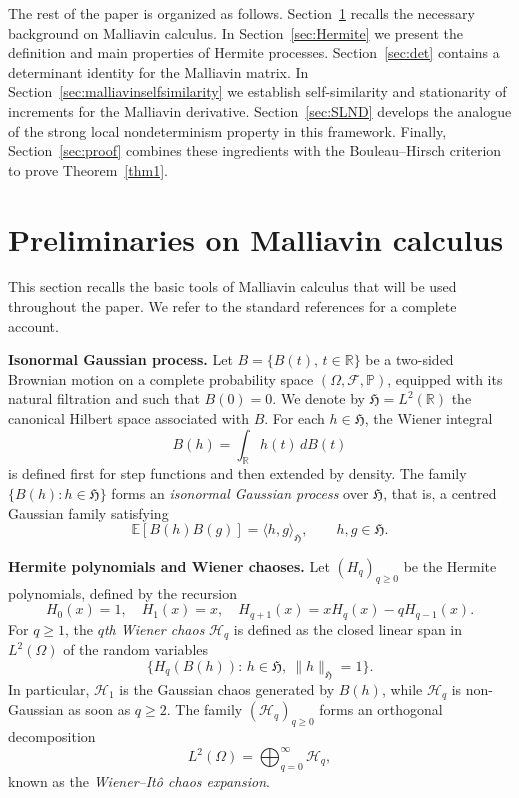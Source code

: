 \documentclass[a4paper,10pt]{article}
\theoremstyle{definition}
\theoremstyle{plain}
\newcommand{\R}{\mathbb{R}}
\renewcommand{\P}{\mathbb{P}}
\newcommand{\E}{\mathbb{E}}
\newcommand\HHH{\mathfrak{H}}
\newcommand\1{\mathbbm{1}}
\begin{document}
\medskip
The rest of the paper is organized as follows.
Section~\ref{sec:Malliavin} recalls the necessary background on Malliavin calculus.  
In Section~\ref{sec:Hermite} we present the definition and main properties of Hermite processes.  
Section~\ref{sec:det} contains a determinant identity for the Malliavin matrix. 
In Section~\ref{sec:malliavinselfsimilarity} we establish self-similarity and stationarity of increments for  the Malliavin derivative.  
Section~\ref{sec:SLND} develops the analogue of the strong local nondeterminism property in this framework.  
Finally, Section~\ref{sec:proof} combines these ingredients with the Bouleau--Hirsch criterion to prove Theorem~\ref{thm1}.



\section{Preliminaries on Malliavin calculus}\label{sec:Malliavin}

This section recalls the basic tools of Malliavin calculus that will be used throughout the paper.  
We refer to the standard references \cite{nourdin2012normal, Nualart, Sanz-Sole} for a complete account.


\medskip
\noindent\textbf{Isonormal Gaussian process.}  
Let $B=\{B(t),\,t\in\R\}$ be a two-sided  Brownian motion on a complete probability space $(\Omega,\mathcal F,\P)$, equipped with its natural filtration and such that $B(0)=0$.  
We denote by $\HHH=L^2(\R)$ the canonical Hilbert space associated with $B$. For each $h\in\HHH$, the Wiener integral
\[
B(h)=\int_\R h(t)\,dB(t)
\]
is defined first for step functions and then extended by density.  
The family $\{B(h):h\in\HHH\}$ forms an \emph{isonormal Gaussian process} over $\HHH$, that is, a centred Gaussian family satisfying
\[
\E[B(h)B(g)] = \langle h,g\rangle_{\HHH}, \qquad h,g\in\HHH.
\]

\medskip
\noindent\textbf{Hermite polynomials and Wiener chaoses.}  
Let $(H_q)_{q\ge0}$ be the Hermite polynomials, defined by the recursion
\[
H_0(x)=1,\quad H_1(x)=x,\quad H_{q+1}(x)=xH_q(x)-qH_{q-1}(x).
\]
For $q\ge1$, the \emph{$q$th Wiener chaos} $\mathcal H_q$ is defined as the closed linear span in $L^2(\Omega)$ of the random variables
\[
\{H_q(B(h)):\, h\in\HHH,\ \|h\|_{\HHH}=1\}.
\]
In particular, $\mathcal H_1$ is the Gaussian chaos generated by $B(h)$, while $\mathcal H_q$ is non-Gaussian as soon as $q\ge2$.  
The family $(\mathcal H_q)_{q\ge0}$ forms an orthogonal decomposition
\[
L^2(\Omega)=\bigoplus_{q=0}^\infty \mathcal H_q,
\]
known as the \emph{Wiener–Itô chaos expansion}.
\end{document}
